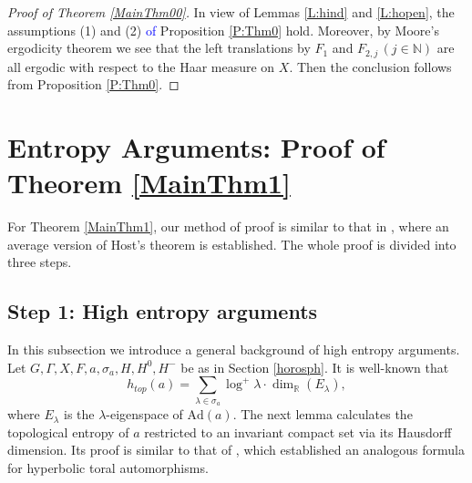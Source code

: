 \documentclass[reqno,12pt]{amsart}
\theoremstyle{definition}
\numberwithin{equation}{section}
\newcommand{\RR}{\mathbb{R}}
\newcommand{\CC}{\mathbb{C}}
\newcommand{\NN}{\mathbb{N}}
\newcommand{\Ad}{\mathrm{Ad}}
\newcommand{\Lie}{\mathrm{Lie}}
\newcommand {\new}[1]   {\textcolor{blue}{#1}}
\newcommand {\comm}[1]   {\textcolor{red}{#1}}
\begin{document}
{\begin{proof}[Proof of Theorem \ref{MainThm00}] %
In view of Lemmas \ref{L:hind} and \ref{L:hopen}, the assumptions (1) and (2) \new{of} Proposition \ref{P:Thm0} hold. Moreover, by Moore's ergodicity theorem we see that the left translations by $F_1$ and $F_{2,j}\,(j\in\NN)$ are all ergodic with respect to the Haar measure on $X$. Then the conclusion follows from Proposition \ref{P:Thm0}.
\end{proof}







\section{Entropy Arguments: Proof of Theorem \ref{MainThm1}} \label{entropy} For Theorem \ref{MainThm1}, our method of proof is similar to that in \cite{John95}, where an average version of Host's theorem is established. The whole proof is divided into three steps.

\subsection{Step 1: High entropy arguments} In this subsection we introduce a general background of high entropy arguments. Let {$G,\Gamma,X,F,a,\sigma_a,H,H^0,H^-$ be as in Section \ref{horosph}}. %
It is well-known that $$
h_{top}(a)
=\sum\limits_{\lambda\in{\sigma_a}}\log^+\lambda\cdot\dim_\RR(E_{\lambda}),
$$
where $E_{\lambda}$ is the $\lambda$-eigenspace of $\Ad(a)$. The %
{next} lemma calculates the topological entropy of $a$ restricted to an invariant compact set via its Hausdorff dimension. Its proof is similar to that of \cite[Proposition 2.4]{bet15}, {which established an analogous formula for hyperbolic toral automorphisms.}

}
\end{document}
